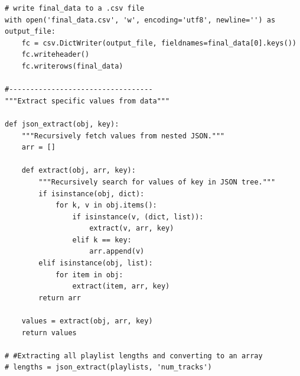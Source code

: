 \documentclass[12pt]{article}
\theoremstyle{plain}
\theoremstyle{definition}
\theoremstyle{remark}
\begin{document}
\begin{appendices}
\begin{verbatim}
# write final_data to a .csv file
with open('final_data.csv', 'w', encoding='utf8', newline='') as output_file:
    fc = csv.DictWriter(output_file, fieldnames=final_data[0].keys())
    fc.writeheader()
    fc.writerows(final_data)

#----------------------------------
"""Extract specific values from data"""

def json_extract(obj, key):
    """Recursively fetch values from nested JSON."""
    arr = []

    def extract(obj, arr, key):
        """Recursively search for values of key in JSON tree."""
        if isinstance(obj, dict):
            for k, v in obj.items():
                if isinstance(v, (dict, list)):
                    extract(v, arr, key)
                elif k == key:
                    arr.append(v)
        elif isinstance(obj, list):
            for item in obj:
                extract(item, arr, key)
        return arr

    values = extract(obj, arr, key)
    return values

# #Extracting all playlist lengths and converting to an array
# lengths = json_extract(playlists, 'num_tracks')
\end{verbatim}


\end{appendices}
\end{document}
